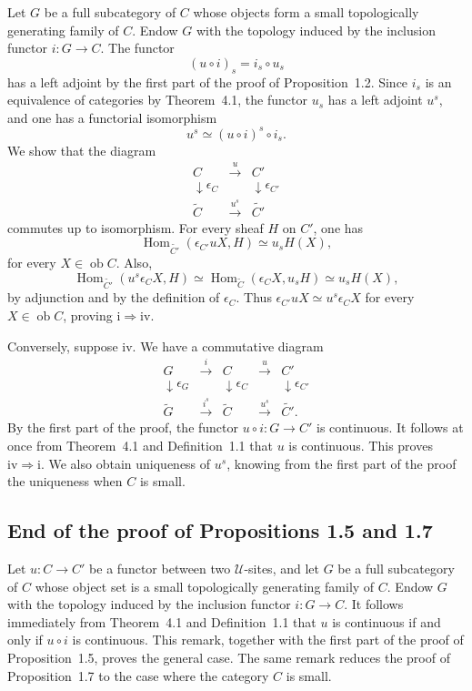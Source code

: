\documentclass[11pt]{article}
\newcommand{\U}{\mathcal{U}}
\newcommand{\Hom}{\operatorname{Hom}}
\newcommand{\ob}{\operatorname{ob}}
\begin{document}
Let \(G\) be a full subcategory of \(C\) whose objects form a small topologically generating family of \(C\). Endow \(G\) with the topology induced by the inclusion functor \(i:G\to C\). The functor
\[
(u\circ i)_s=i_s\circ u_s
\]
has a left adjoint by the first part of the proof of Proposition~1.2. Since \(i_s\) is an equivalence of categories by Theorem~4.1, the functor \(u_s\) has a left adjoint \(u^s\), and one has a functorial isomorphism
\[
u^s\simeq (u\circ i)^s\circ i_s.
\]
We show that the diagram
\[
\begin{array}{ccc}
C&\xrightarrow{u}&C'\\
\downarrow\epsilon_C&&\downarrow\epsilon_{C'}\\
\widetilde C&\xrightarrow{u^s}&\widetilde{C'}
\end{array}\tag{4.2.1}
\]
commutes up to isomorphism. For every sheaf \(H\) on \(C'\), one has
\[
\Hom_{\widetilde{C'}}(\epsilon_{C'}uX,H)\simeq u_sH(X),
\]
for every \(X\in\ob C\). Also,
\[
\Hom_{\widetilde{C'}}(u^s\epsilon_CX,H)
\simeq\Hom_{\widetilde C}(\epsilon_CX,u_sH)
\simeq u_sH(X),
\]
by adjunction and by the definition of \(\epsilon_C\). Thus \(\epsilon_{C'}uX\simeq u^s\epsilon_CX\) for every \(X\in\ob C\), proving \(\mathrm{i}\Rightarrow\mathrm{iv}\).

Conversely, suppose \(\mathrm{iv}\). We have a commutative diagram
\[
\begin{array}{ccccc}
G&\xrightarrow{i}&C&\xrightarrow{u}&C'\\
\downarrow\epsilon_G&&\downarrow\epsilon_C&&\downarrow\epsilon_{C'}\\
\widetilde G&\xrightarrow{i^s}&\widetilde C&\xrightarrow{u^s}&\widetilde{C'}.
\end{array}\tag{4.2.2}
\]
By the first part of the proof, the functor \(u\circ i:G\to C'\) is continuous. It follows at once from Theorem~4.1 and Definition~1.1 that \(u\) is continuous. This proves \(\mathrm{iv}\Rightarrow\mathrm{i}\). We also obtain uniqueness of \(u^s\), knowing from the first part of the proof the uniqueness when \(C\) is small.

\subsection{End of the proof of Propositions 1.5 and 1.7}

Let \(u:C\to C'\) be a functor between two \(\U\)-sites, and let \(G\) be a full subcategory of \(C\) whose object set is a small topologically generating family of \(C\). Endow \(G\) with the topology induced by the inclusion functor \(i:G\to C\). It follows immediately from Theorem~4.1 and Definition~1.1 that \(u\) is continuous if and only if \(u\circ i\) is continuous. This remark, together with the first part of the proof of Proposition~1.5, proves the general case. The same remark reduces the proof of Proposition~1.7 to the case where the category \(C\) is small.
\end{document}
